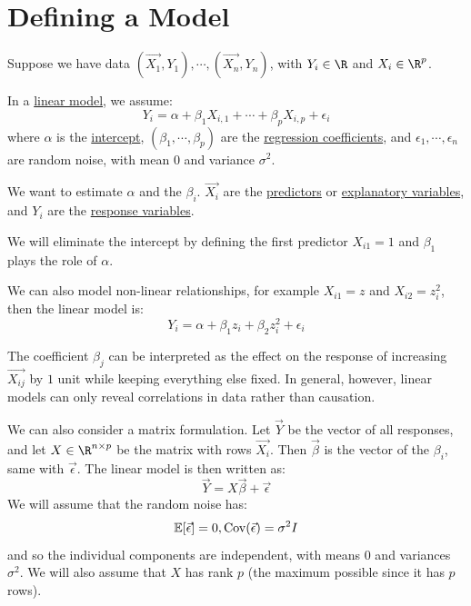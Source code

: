 \documentclass[../Main.tex]{subfiles}
\begin{document}
\section{Defining a Model}
Suppose we have data $(\vec{X_1}, Y_1), \cdots, (\vec{X_n}, Y_n)$, with $Y_i \in \R$ and $X_i \in \R^p$.

In a \underline{linear model}, we assume:
\begin{equation*}
    Y_i = \alpha + \beta_1 X_{i,1} + \cdots + \beta_p X_{i,p} + \epsilon_{i}
\end{equation*}
where $\alpha$ is the \underline{intercept}, $(\beta_1, \cdots, \beta_p)$ are the \underline{regression coefficients}, and $\epsilon_1, \cdots, \epsilon_n$ are random noise, with mean $0$ and variance $\sigma^2$.

We want to estimate $\alpha$ and the $\beta_i$. $\vec{X_i}$ are the \underline{predictors} or \underline{explanatory variables}, and $Y_i$ are the \underline{response variables}.

\begin{remarks}
    \item We will eliminate the intercept by defining the first predictor $X_{i1} = 1$ and $\beta_1$ plays the role of $\alpha$.
    \item We can also model non-linear relationships, for example $X_{i1} = z$ and $X_{i2} = z_i^2$, then the linear model is:
        \begin{equation*}
            Y_i = \alpha + \beta_1 z_i + \beta_2 z_i^2 + \epsilon_i
        \end{equation*}
    \item The coefficient $\beta_j$ can be interpreted as the effect on the response of increasing $\vec{X_{ij}}$ by $1$ unit while keeping everything else fixed. In general, however, linear models can only reveal correlations in data rather than causation.
\end{remarks}
We can also consider a matrix formulation. Let $\vec{Y}$ be the vector of all responses, and let $X \in \R^{n \times p}$ be the matrix with rows $\vec{X_i}$. Then $\vec{\beta}$ is the vector of the $\beta_i$, same with $\vec{\epsilon}$. The linear model is then written as:
\begin{equation*}
    \vec{Y} = X\vec{\beta} + \vec{\epsilon}
\end{equation*}
We will assume that the random noise has:
\begin{equation*}
    \mathbb{E}[\vec{\epsilon}] = 0, \operatorname{Cov}(\vec{\epsilon}) = \sigma^2 I
\end{equation*}
and so the individual components are independent, with means $0$ and variances $\sigma^2$. We will also assume that $X$ has rank $p$ (the maximum possible since it has $p$ rows).
\end{document}

